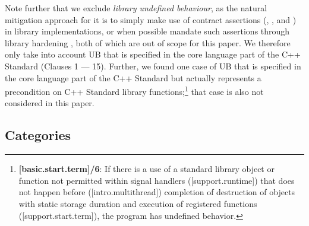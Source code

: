 Note further that we exclude \emph{library undefined behaviour}, as the natural mitigation approach for it is to simply make use of contract assertions (, , and ) in library implementations, or when possible mandate such assertions through library hardening \cite{P3471R4}, both of which are out of scope for this paper. We therefore only take into account UB that is specified in the core language part of the C++ Standard (Clauses 1 --- 15). Further, we found one case of UB that is specified in the core language part of the C++ Standard but actually represents a precondition on C++ Standard library functions;\footnote{\textbf{[basic.start.term]/6}: If there is a use of a standard library object or function not permitted within signal handlers ([support.runtime]) that does not happen before ([intro.multithread]) completion of destruction of objects with static storage duration and execution of  registered functions ([support.start.term]), the program has undefined behavior.}
that case is also not considered in this paper.

\subsection{Categories}
\label{categories}

